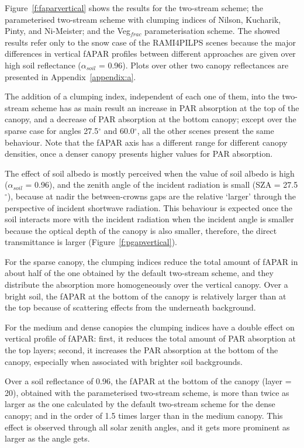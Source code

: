 \documentclass[a4paper,11pt]{report}
\begin{document}
Figure~\ref{f:faparvertical} shows the results for the two-stream scheme; the parameterised two-stream scheme with clumping indices of Nilson, Kucharik, Pinty, and Ni-Meister; and the Veg$_{frac}$ parameterisation scheme. The showed results refer only to the snow case of the RAMI4PILPS scenes because the major differences in vertical fAPAR profiles between different approaches are given over high soil reflectance ($\alpha_{soil}$ = 0.96). Plots over other two canopy reflectances are presented in Appendix~\ref{appendix:a}.

The addition of a clumping index, independent of each one of them, into the two-stream scheme has as main result an increase in PAR absorption at the top of the canopy, and a decrease of PAR absorption at the bottom canopy; except over the sparse case for angles 27.5$^{\circ}$ and 60.0$^{\circ}$, all the other scenes present the same behaviour. Note that the fAPAR axis has a different range for different canopy densities, once a denser canopy presents higher values for PAR absorption.

The effect of soil albedo is mostly perceived when the value of soil albedo is high ($\alpha_{soil}$ = 0.96), and the zenith angle of the incident radiation is small (SZA = 27.5$^{\circ}$), because at nadir the between-crowns gaps are the relative `larger' through the perspective of incident shortwave radiation. This behaviour is expected once the soil interacts more with the incident radiation when the incident angle is smaller because the optical depth of the canopy is also smaller, therefore, the direct transmittance is larger (Figure~\ref{f:pgapvertical}).

For the sparse canopy, the clumping indices reduce the total amount of fAPAR in about half of the one obtained by the default two-stream scheme, and they distribute the absorption more homogeneously over the vertical canopy. Over a bright soil, the fAPAR at the bottom of the canopy is relatively larger than at the top because of scattering effects from the underneath background.

For the medium and dense canopies the clumping indices have a double effect on vertical profile of fAPAR: first, it reduces the total amount of PAR absorption at the top layers; second, it increases the PAR absorption at the bottom of the canopy, especially when associated with brighter soil backgrounds.

Over a soil reflectance of 0.96, the fAPAR at the bottom of the canopy (layer = 20), obtained with the parameterised two-stream scheme, is more than twice as larger as the one calculated by the default two-stream scheme for the dense canopy; and in the order of 1.5 times larger than in the medium canopy. This effect is observed through all solar zenith angles, and it gets more prominent as larger as the angle gets. 
\end{document}
